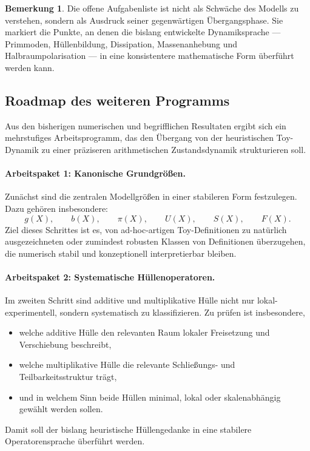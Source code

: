 \documentclass[11pt,a4paper]{article}
\theoremstyle{definition}
\newtheorem{bemerkung}{Bemerkung}
\begin{document}
\begin{bemerkung}
	Die offene Aufgabenliste ist nicht als Schwäche des Modells zu verstehen, sondern als Ausdruck seiner gegenwärtigen Übergangsphase. Sie markiert die Punkte, an denen die bislang entwickelte Dynamiksprache — Primmoden, Hüllenbildung, Dissipation, Massenanhebung und Halbraumpolarisation — in eine konsistentere mathematische Form überführt werden kann.
\end{bemerkung}
\subsection{Roadmap des weiteren Programms}

Aus den bisherigen numerischen und begrifflichen Resultaten ergibt sich ein mehrstufiges Arbeitsprogramm, das den Übergang von der heuristischen Toy-Dynamik zu einer präziseren arithmetischen Zustandsdynamik strukturieren soll.

\paragraph{Arbeitspaket 1: Kanonische Grundgrößen.}
Zunächst sind die zentralen Modellgrößen in einer stabileren Form festzulegen. Dazu gehören insbesondere:
\[
g(X),\qquad b(X),\qquad \pi(X),\qquad U(X),\qquad S(X),\qquad F(X).
\]
Ziel dieses Schrittes ist es, von ad-hoc-artigen Toy-Definitionen zu natürlich ausgezeichneten oder zumindest robusten Klassen von Definitionen überzugehen, die numerisch stabil und konzeptionell interpretierbar bleiben.

\paragraph{Arbeitspaket 2: Systematische Hüllenoperatoren.}
Im zweiten Schritt sind additive und multiplikative Hülle nicht nur lokal-experimentell, sondern systematisch zu klassifizieren. Zu prüfen ist insbesondere,
\begin{itemize}
	\item welche additive Hülle den relevanten Raum lokaler Freisetzung und Verschiebung beschreibt,
	\item welche multiplikative Hülle die relevante Schließungs- und Teilbarkeitsstruktur trägt,
	\item und in welchem Sinn beide Hüllen minimal, lokal oder skalenabhängig gewählt werden sollen.
\end{itemize}
Damit soll der bislang heuristische Hüllengedanke in eine stabilere Operatorensprache überführt werden.
\end{document}
